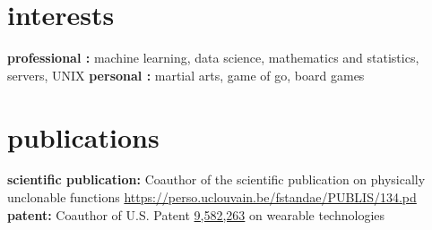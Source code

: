 \documentclass[]{friggeri-cv} %
\begin{document}
\section{interests}

\textbf{professional :} machine learning, data science, mathematics and
statistics, servers, UNIX
\medbreak
\textbf{personal :} martial arts, game of go, board games


\section{publications}

\textbf{scientific publication:} Coauthor of the scientific publication on physically unclonable functions
\href{https://perso.uclouvain.be/fstandae/PUBLIS/134.pd}{https://perso.uclouvain.be/fstandae/PUBLIS/134.pd}
\medbreak
\textbf{patent:} Coauthor of U.S. Patent
\href{http://patft.uspto.gov/netacgi/nph-Parser?Sect2=PTO1&Sect2=HITOFF&p=1&u=/netahtml/PTO/search-bool.html&r=1&f=G&l=50&d=PALL&RefSrch=yes&Query=PN/9582263}{9,582,263}
on wearable technologies

\end{document}
